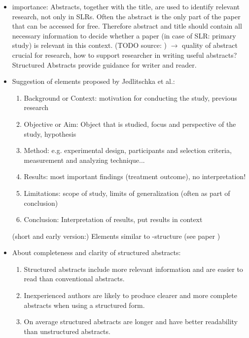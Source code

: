 \begin{itemize}
\item importance: Abstracts, together with the title, are used to identify relevant research, not only in SLRs. Often the abstract is the only part of the paper that can be accessed for free. Therefore abstract and title should contain all necessary information to decide whether a paper (in case of SLR: primary study) is relevant in this context. (TODO source: )
	$\rightarrow$ quality of abstract crucial for research, how to support researcher in writing useful abstracts? Structured Abstracts provide guidance for writer and reader. 
\item Suggestion of elements proposed by Jedlitschka et al.\cite{Jedlitschka2008}: 
	\begin{enumerate}
		\item Background or Context: motivation for conducting the study, previous research
		\item Objective or Aim: Object that is studied, focus and perspective of the study, hypothesis
		\item Method: e.g. experimental design, participants and selection criteria, measurement and analyzing technique...
		\item Results: most important findings (treatment outcome), no interpretation!
		\item Limitations: scope of study, limits of generalization (often as part of conclusion)
		\item Conclusion: Interpretation of results, put results in context
	\end{enumerate}
	(short and early version:\cite{Jedlitschka2005})
	\newline
	Elements similar to -structure (see paper )
\item About completeness and clarity of structured abstracts:
	\begin{enumerate}
	\item Structured abstracts include more relevant information and are easier to read than conventional abstracts. \cite{Budgen2008} \cite{Budgen2007}
	\item Inexperienced authors are likely to produce clearer and more complete abstracts when using a structured form.\cite{Budgen2011} 
	\item On average structured abstracts are longer and have better readability than unstructured abstracts. \cite{KBO2008}

\end{enumerate}
\end{itemize}
